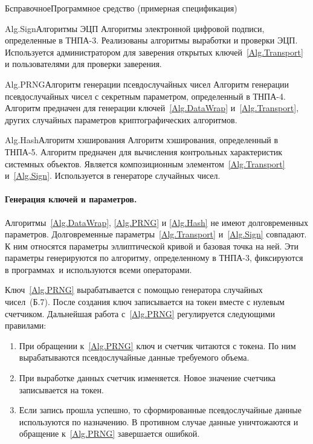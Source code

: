\begin{appendix}{Б}{справочное}{Программное средство \CryptoDisk 
(примерная спецификация)}
\begin{definition}{Alg.Sign}{Алгоритмы ЭЦП} 
Алгоритмы электронной цифровой подписи, определенные в ТНПА-3. 
Реализованы алгоритмы выработки и проверки ЭЦП.
Используется администратором для заверения открытых 
ключей~\ref{Alg.Transport} и пользователями для проверки заверения.
\end{definition}

\begin{definition}{Alg.PRNG}{Алгоритм генерации псевдослучайных чисел} 
Алгоритм генерации псевдослучайных чисел с секретным параметром, 
определенный в ТНПА-4. 
Алгоритм предначен для генерации ключей~\ref{Alg.DataWrap} и~\ref{Alg.Transport}, 
других случайных параметров криптографических алгоритмов.
\end{definition}

\begin{definition}{Alg.Hash}{Алгоритм хэширования} 
Алгоритм хэширования, определенный в ТНПА-5. 
Алгоритм предначен для вычисления контрольных характеристик 
системных объектов. Является композиционным 
элементом~\ref{Alg.Transport} и~\ref{Alg.Sign}.
Используется в генераторе случайных чисел.
\end{definition}

\paragraph*{Генерация ключей и параметров.} 
Алгоритмы~\ref{Alg.DataWrap}, \ref{Alg.PRNG} и \ref{Alg.Hash}
не имеют долговременных параметров. 
%
Долговременные параметры~\ref{Alg.Transport} и~\ref{Alg.Sign} совпадают.
К ним относятся параметры эллиптической кривой и базовая точка на ней. 
Эти параметры генерируются по алгоритму, определенному в ТНПА-3, 
фиксируются в программах~\CryptoDisk и используются всеми операторами.

Ключ~\ref{Alg.PRNG} вырабатывается с помощью генератора случайных чисел~(Б.7). 
После создания ключ записывается на токен вместе с нулевым счетчиком. 
Дальнейшая работа с~\ref{Alg.PRNG} регулируется следующими правилами:
\begin{enumerate} 
\item
При обращении к~\ref{Alg.PRNG} ключ и счетчик читаются с токена. 
По ним вырабатываются псевдослучайные данные требуемого объема. 
\item
При выработке данных счетчик изменяется.
Новое значение счетчика записывается на токен. 
\item
Если запись прошла успешно,
то сформированные псевдослучайные данные используются по назначению. 
В противном случае данные уничтожаются 
и обращение к~\ref{Alg.PRNG} завершается ошибкой.
\end{enumerate} 


\end{appendix}
